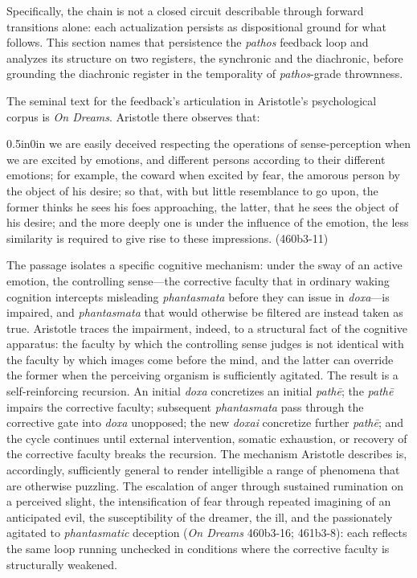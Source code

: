 \documentclass{article}
\begin{document}
Specifically, the chain is not a closed circuit describable through forward transitions alone: each actualization persists as dispositional ground for what follows. This section names that persistence the \textit{pathos} feedback loop and analyzes its structure on two registers, the synchronic and the diachronic, before grounding the diachronic register in the temporality of \textit{pathos}-grade thrownness.

The seminal text for the feedback's articulation in Aristotle's psychological corpus is \textit{On Dreams}. Aristotle there observes that: 
\begin{adjustwidth}{0.5in}{0in}
    we are easily deceived respecting the operations of sense-perception when we are excited by emotions, and different persons according to their different emotions; for example, the coward when excited by fear, the amorous person by the object of his desire; so that, with but little resemblance to go upon, the former thinks he sees his foes approaching, the latter, that he sees the object of his desire; and the more deeply one is under the influence of the emotion, the less similarity is required to give rise to these impressions. (460b3-11)
\end{adjustwidth}
The passage isolates a specific cognitive mechanism: under the sway of an active emotion, the controlling sense---the corrective faculty that in ordinary waking cognition intercepts misleading \textit{phantasmata} before they can issue in \textit{doxa}---is impaired, and \textit{phantasmata} that would otherwise be filtered are instead taken as true. Aristotle traces the impairment, indeed, to a structural fact of the cognitive apparatus: the faculty by which the controlling sense judges is not identical with the faculty by which images come before the mind, and the latter can override the former when the perceiving organism is sufficiently agitated. The result is a self-reinforcing recursion. An initial \textit{doxa} concretizes an initial \textit{path\=e}; the \textit{path\=e} impairs the corrective faculty; subsequent \textit{phantasmata} pass through the corrective gate into \textit{doxa} unopposed; the new \textit{doxai} concretize further \textit{path\=e}; and the cycle continues until external intervention, somatic exhaustion, or recovery of the corrective faculty breaks the recursion. The mechanism Aristotle describes is, accordingly, sufficiently general to render intelligible a range of phenomena that are otherwise puzzling. The escalation of anger through sustained rumination on a perceived slight, the intensification of fear through repeated imagining of an anticipated evil, the susceptibility of the dreamer, the ill, and the passionately agitated to \textit{phantasmatic} deception (\textit{On Dreams} 460b3-16; 461b3-8): each reflects the same loop running unchecked in conditions where the corrective faculty is structurally weakened. 
\end{document}
